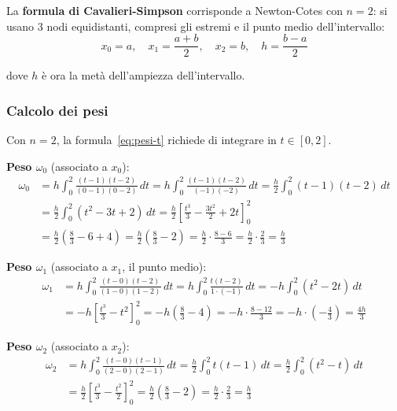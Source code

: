 \documentclass[a4paper,12pt]{article}
\theoremstyle{definition}
\theoremstyle{remark}
\begin{document}
La \textbf{formula di Cavalieri-Simpson} corrisponde a Newton-Cotes con
$n = 2$: si usano 3 nodi equidistanti, compresi gli estremi e il punto
medio dell'intervallo:
\[
  x_0 = a, \quad
  x_1 = \frac{a+b}{2}, \quad
  x_2 = b, \quad
  h = \frac{b-a}{2}
\]

\noindent dove $h$ è ora la metà dell'ampiezza dell'intervallo.

\subsubsection*{Calcolo dei pesi}

Con $n = 2$, la formula~\eqref{eq:pesi-t} richiede di integrare in
$t \in [0, 2]$.

\medskip\noindent
\textbf{Peso $\omega_0$} (associato a $x_0$):
\begin{align*}
  \omega_0
  &= h\int_0^2 \frac{(t-1)(t-2)}{(0-1)(0-2)}\,dt
   = h\int_0^2 \frac{(t-1)(t-2)}{(-1)(-2)}\,dt
   = \frac{h}{2}\int_0^2 (t-1)(t-2)\,dt \\
  &= \frac{h}{2}\int_0^2 (t^2 - 3t + 2)\,dt
   = \frac{h}{2}\left[\frac{t^3}{3} - \frac{3t^2}{2} + 2t\right]_0^2 \\
  &= \frac{h}{2}\!\left(\frac{8}{3} - 6 + 4\right)
   = \frac{h}{2}\!\left(\frac{8}{3} - 2\right)
   = \frac{h}{2} \cdot \frac{8 - 6}{3}
   = \frac{h}{2} \cdot \frac{2}{3}
   = \frac{h}{3}
\end{align*}

\noindent
\textbf{Peso $\omega_1$} (associato a $x_1$, il punto medio):
\begin{align*}
  \omega_1
  &= h\int_0^2 \frac{(t-0)(t-2)}{(1-0)(1-2)}\,dt
   = h\int_0^2 \frac{t(t-2)}{1 \cdot (-1)}\,dt
   = -h\int_0^2 (t^2 - 2t)\,dt \\
  &= -h\left[\frac{t^3}{3} - t^2\right]_0^2
   = -h\!\left(\frac{8}{3} - 4\right)
   = -h \cdot \frac{8 - 12}{3}
   = -h \cdot \left(-\frac{4}{3}\right)
   = \frac{4h}{3}
\end{align*}

\noindent
\textbf{Peso $\omega_2$} (associato a $x_2$):
\begin{align*}
  \omega_2
  &= h\int_0^2 \frac{(t-0)(t-1)}{(2-0)(2-1)}\,dt
   = \frac{h}{2}\int_0^2 t(t-1)\,dt
   = \frac{h}{2}\int_0^2 (t^2 - t)\,dt \\
  &= \frac{h}{2}\left[\frac{t^3}{3} - \frac{t^2}{2}\right]_0^2
   = \frac{h}{2}\!\left(\frac{8}{3} - 2\right)
   = \frac{h}{2} \cdot \frac{2}{3}
   = \frac{h}{3}
\end{align*}
\end{document}
